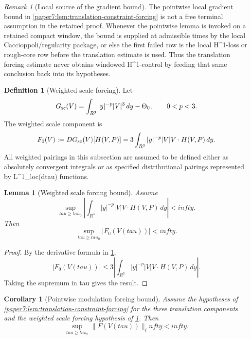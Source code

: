 \documentclass[11pt]{amsart}
\def\({}%
\def\){}%
\def\mathbb#1{#1}%
\def\tau{tau}%
\def\infty{infty}%
\theoremstyle{plain}
\newtheorem{lemma}[lemma]{Lemma}
\newtheorem{corollary}[corollary]{Corollary}
\theoremstyle{definition}
\newtheorem{definition}[definition]{Definition}
\theoremstyle{remark}
\newtheorem{remark}[remark]{Remark}
\begin{document}
\begin{remark}[Local source of the gradient bound]
\label{paper7:rem:translation-gradient-input}
The pointwise local gradient bound in
\cref{paper7:lem:translation-constraint-forcing} is not a free terminal
assumption in the retained proof.  Whenever the pointwise lemma is invoked on a
retained compact window, the bound is supplied at admissible times by the local
Caccioppoli/regularity package, or else the first failed row is the local
\(H^1\)-loss or rough-core row before the translation estimate is used.  Thus the
translation forcing estimate never obtains windowed \(H^1\)-control by feeding
that same conclusion back into its hypotheses.
\end{remark}

\begin{definition}[Weighted scale forcing]
\label{paper7:def:weighted-scale-forcing}
Let
\[
  G_{\rm sc}(V)=\int_{\mathbb R^3}|y|^{-p}|V|^3\,dy-\Theta_0,
  \qquad 0<p<3.
\]
The weighted scale component is
\[
  F_0(V):=DG_{\rm sc}(V)[H(V,P)]
  =
  3\int_{\mathbb R^3}|y|^{-p}|V|V\cdot H(V,P)\,dy.
\]
All weighted pairings in this subsection are assumed to be defined either as
absolutely convergent integrals or as specified distributional pairings
represented by \(L^1_{\rm loc}(d\tau)\) functions.
\end{definition}

\begin{lemma}[Weighted scale forcing bound]
\label{paper7:lem:scale-component-weighted-forcing}
Assume
\[
  \sup_{\tau\ge\tau_0}
  \left|
  \int_{\mathbb R^3}|y|^{-p}|V|V\cdot H(V,P)\,dy
  \right|<\infty.
\]
Then
\[
  \sup_{\tau\ge\tau_0}|F_0(V(\tau))|<\infty.
\]
\end{lemma}

\begin{proof}
By the derivative formula in \cref{paper7:def:weighted-scale-forcing},
\[
  |F_0(V(\tau))|
  \le
  3\left|
  \int_{\mathbb R^3}|y|^{-p}|V|V\cdot H(V,P)\,dy
  \right|.
\]
Taking the supremum in \(\tau\) gives the result.
\end{proof}

\begin{corollary}[Pointwise modulation forcing bound]
\label{paper7:cor:pointwise-modulation-forcing}
Assume the hypotheses of \cref{paper7:lem:translation-constraint-forcing} for
the three translation components and the weighted scale forcing hypothesis of
\cref{paper7:lem:scale-component-weighted-forcing}.  Then
\[
  \sup_{\tau\ge\tau_0}\|F(V(\tau))\|_\infty<\infty .
\]
\end{corollary}
\end{document}

